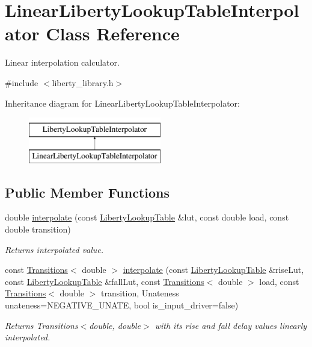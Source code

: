 \hypertarget{classLinearLibertyLookupTableInterpolator}{\section{Linear\-Liberty\-Lookup\-Table\-Interpolator Class Reference}
\label{classLinearLibertyLookupTableInterpolator}
}


Linear interpolation calculator.  




{\ttfamily \#include $<$liberty\-\_\-library.\-h$>$}

Inheritance diagram for Linear\-Liberty\-Lookup\-Table\-Interpolator\-:\begin{figure}[H]
\begin{center}
\leavevmode
\includegraphics[height=2.000000cm]{classLinearLibertyLookupTableInterpolator}
\end{center}
\end{figure}
\subsection*{Public Member Functions}
\begin{DoxyCompactItemize}
\item 
double \hyperlink{classLinearLibertyLookupTableInterpolator_afd4bc7bfcf9e969478fbc9505b588bf3}{interpolate} (const \hyperlink{structLibertyLookupTable}{Liberty\-Lookup\-Table} \&lut, const double load, const double transition)
\begin{DoxyCompactList}\small\item\em Returns interpolated value. \end{DoxyCompactList}\item 
const \hyperlink{classTransitions}{Transitions}$<$ double $>$ \hyperlink{classLinearLibertyLookupTableInterpolator_a9b0f96185327e7cb0e5c315691eb6579}{interpolate} (const \hyperlink{structLibertyLookupTable}{Liberty\-Lookup\-Table} \&rise\-Lut, const \hyperlink{structLibertyLookupTable}{Liberty\-Lookup\-Table} \&fall\-Lut, const \hyperlink{classTransitions}{Transitions}$<$ double $>$ load, const \hyperlink{classTransitions}{Transitions}$<$ double $>$ transition, Unateness unateness=N\-E\-G\-A\-T\-I\-V\-E\-\_\-\-U\-N\-A\-T\-E, bool is\-\_\-input\-\_\-driver=false)
\begin{DoxyCompactList}\small\item\em Returns Transitions$<$double, double$>$ with its rise and fall delay values linearly interpolated. \end{DoxyCompactList}\end{DoxyCompactItemize}
